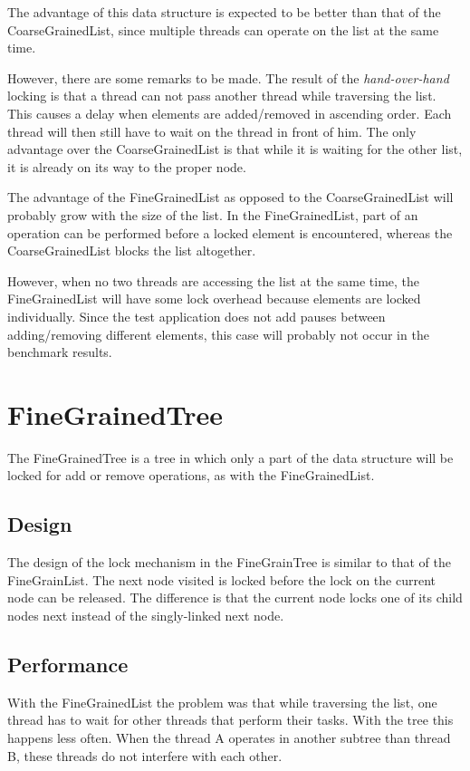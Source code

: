 \documentclass[a4paper]{article}
\begin{document}
The advantage of this data structure is expected to be better than that of the
CoarseGrainedList, since multiple threads can operate on the list at the same
time.

However, there are some remarks to be made. The result of the 
\emph{hand-over-hand} locking is that a thread can not pass another thread
while traversing the list. This causes a delay when elements are added/removed
in ascending order. Each thread will then still have to wait on the thread in
front of him. The only advantage over the CoarseGrainedList is that while
it is waiting for the other list, it is already on its way to the proper node.

The advantage of the FineGrainedList as opposed to the CoarseGrainedList will
probably grow with the size of the list. In the FineGrainedList, part of an
operation can be performed before a locked element is encountered, whereas the
CoarseGrainedList blocks the list altogether.

However, when no two threads are accessing the list at the same time, the
FineGrainedList will have some lock overhead because elements are locked
individually. Since the test application does not add pauses between
adding/removing different elements, this case will probably not occur in the
benchmark results.

\section{FineGrainedTree}

The FineGrainedTree is a tree in which only a part of the data structure
will be locked for add or remove operations, as with the FineGrainedList.

\subsection{Design}

The design of the lock mechanism in the FineGrainTree is similar to that of the
FineGrainList. The next node visited is locked before the lock on the current
node can be released. The difference is that the current node locks one of its
child nodes next instead of the singly-linked next node.

\subsection{Performance}

With the FineGrainedList the problem was that while traversing the list, one
thread has to wait for other threads that perform their tasks. With the tree
this happens less often. When the thread A operates in another subtree than
thread B, these threads do not interfere with each other.
\end{document}
